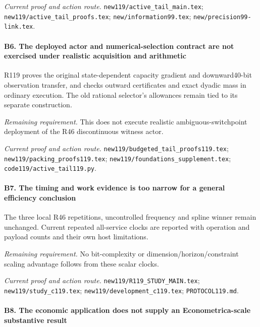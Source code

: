 \par\emph{Current proof and action route.} \nolinkurl{new119/active_tail_main.tex}; \nolinkurl{new119/active_tail_proofs.tex}; \nolinkurl{new/information99.tex}; \nolinkurl{new/precision99-link.tex}.

\paragraph{B6. The deployed actor and numerical-selection contract are not exercised under realistic acquisition and arithmetic}

R119 proves the original state-dependent capacity gradient and downward40-bit observation transfer, and checks outward certificates and exact dyadic mass in ordinary execution. The old rational selector's allowances remain tied to its separate construction.

\par\emph{Remaining requirement.} This does not execute realistic ambiguous-switchpoint deployment of the R46 discontinuous witness actor.

\par\emph{Current proof and action route.} \nolinkurl{new119/budgeted_tail_proofs119.tex}; \nolinkurl{new119/packing_proofs119.tex}; \nolinkurl{new119/foundations_supplement.tex}; \nolinkurl{code119/active_tail119.py}.

\paragraph{B7. The timing and work evidence is too narrow for a general efficiency conclusion}

The three local R46 repetitions, uncontrolled frequency and spline winner remain unchanged. Current repeated all-service clocks are reported with operation and payload counts and their own host limitations.

\par\emph{Remaining requirement.} No bit-complexity or dimension/\allowbreak{}horizon/\allowbreak{}constraint scaling advantage follows from these scalar clocks.

\par\emph{Current proof and action route.} \nolinkurl{new119/R119_STUDY_MAIN.tex}; \nolinkurl{new119/study_c119.tex}; \nolinkurl{new119/development_c119.tex}; \nolinkurl{PROTOCOL119.md}.

\paragraph{B8. The economic application does not supply an Econometrica-scale substantive result}

